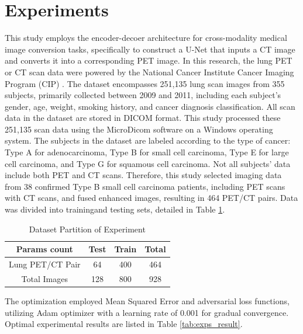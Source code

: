 \documentclass[twocolumn]{article}
\begin{document}
\section{Experiments}
This study employs the encoder-decoer architecture for cross-modality medical image conversion tasks, specifically to construct a U-Net that inputs a CT image and converts it into a corresponding PET image. In this research, the lung PET or CT scan data were powered by the National Cancer Institute Cancer Imaging Program (CIP) \cite{li_large-scale_2020}.  The dataset encompasses 251,135 lung scan images from 355 subjects, primarily collected between 2009 and 2011, including each subject's gender, age, weight, smoking history, and cancer diagnosis classification. All scan data in the dataset are stored in DICOM format. This study processed these 251,135 scan data using the MicroDicom software on a Windows operating system. The subjects in the dataset are labeled according to the type of cancer: Type A for adenocarcinoma, Type B for small cell carcinoma, Type E for large cell carcinoma, and Type G for squamous cell carcinoma. Not all subjects' data include both PET and CT scans. Therefore, this study selected imaging data from 38 confirmed Type B small cell carcinoma patients, including PET scans with CT scans, and fused enhanced images, resulting in 464 PET/CT pairs. Data was divided into trainingand testing sets, detailed in Table \ref{tab:dataset_partition_1}.

\begin{table}[h]
	\centering
	\caption{Dataset Partition of Experiment}
	\label{tab:dataset_partition_1}
	\begin{tabular}{cccc}
		\toprule
		Params count     & Test & Train & Total \\
		\midrule
		Lung PET/CT Pair & 64   & 400   & 464   \\
		Total Images     & 128  & 800   & 928   \\
		\bottomrule
	\end{tabular}
\end{table}

The optimization employed Mean Squared Error and adversarial loss functions, utilizing Adam optimizer with a learning rate of 0.001 for gradual convergence. Optimal experimental results are listed in Table \ref{tab:exps_result}.
\end{document}
